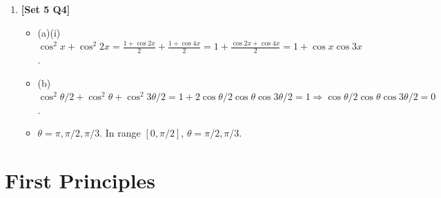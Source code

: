 \documentclass[12pt, a4paper]{article} %
\begin{document}
\begin{enumerate}
    \item \textbf{[Set 5 Q4]}
    \begin{itemize}
        \item (a)(i) $\cos^2 x + \cos^2 2x = \frac{1+\cos 2x}{2} + \frac{1+\cos 4x}{2} = 1 + \frac{\cos 2x + \cos 4x}{2} = 1 + \cos x \cos 3x$.
        \item (b) $\cos^2 \theta/2 + \cos^2 \theta + \cos^2 3\theta/2 = 1 + 2\cos \theta/2 \cos \theta \cos 3\theta/2 = 1 \Rightarrow \cos \theta/2 \cos \theta \cos 3\theta/2 = 0$.
        \item $\theta = \pi, \pi/2, \pi/3$. In range $[0, \pi/2]$, $\theta = \pi/2, \pi/3$.
    \end{itemize}
\end{enumerate}

\section{First Principles}
\end{document}
